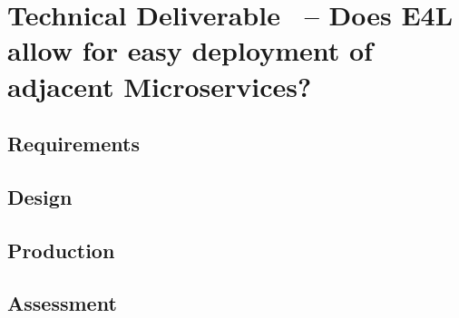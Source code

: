 \section{Technical Deliverable \thetdel\ -- Does E4L allow for easy
deployment of adjacent Microservices?}
{\color{gray}

\subsection{Requirements}
\subsection{Design}
\subsection{Production}
\subsection{Assessment}
}
